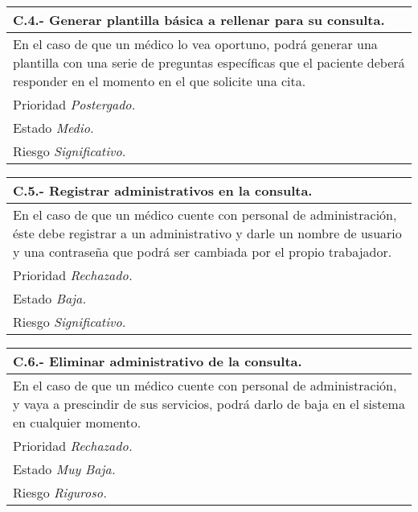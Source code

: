 \documentclass[a4paper,oneside,11pt]{book}
\begin{document}
\begin{center}
\begin{tabulary}{15cm}{|L|}
	\hline
		\bf{C.4.- Generar plantilla básica a rellenar para su consulta.} \\
	\hline
		En el caso de que un médico lo vea oportuno, podrá generar una plantilla con una serie de preguntas específicas que el paciente deberá responder en el momento en el que solicite una cita. \\
	\hline
		Prioridad \textit{Postergado.} \\
	\hline
		Estado \textit{Medio.} \\
	\hline
		Riesgo \textit{Significativo.} \\
	\hline
\end{tabulary}
\end{center}

\begin{center}
\begin{tabulary}{15cm}{|L|}
	\hline
		\bf{C.5.- Registrar administrativos en la consulta.} \\
	\hline
		En el caso de que un médico cuente con personal de administración, éste debe registrar a un administrativo y darle un nombre de usuario y una contraseña que podrá ser cambiada por el propio trabajador. \\
	\hline
		Prioridad \textit{Rechazado.} \\
	\hline
		Estado \textit{Baja.} \\
	\hline
		Riesgo \textit{Significativo.} \\
	\hline
\end{tabulary}
\end{center}

\begin{center}
\begin{tabulary}{15cm}{|L|}
	\hline
		\bf{C.6.- Eliminar administrativo de la consulta.} \\
	\hline
		En el caso de que un médico cuente con personal de administración, y vaya a prescindir de sus servicios, podrá darlo de baja en el sistema en cualquier momento. \\
	\hline
		Prioridad \textit{Rechazado.} \\
	\hline
		Estado \textit{Muy Baja.} \\
	\hline
		Riesgo \textit{Riguroso.} \\
	\hline
\end{tabulary}
\end{center}
\end{document}
